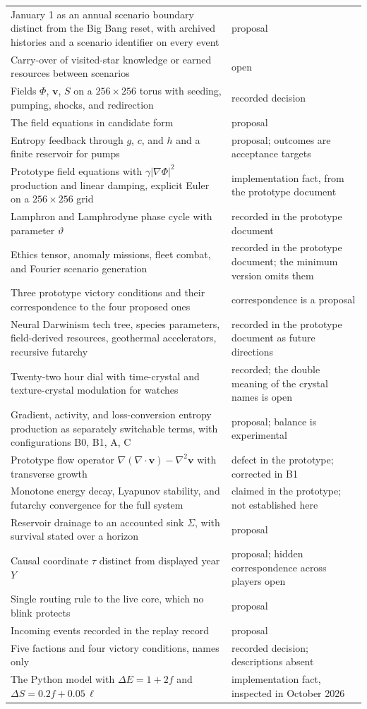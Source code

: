 \documentclass[11pt]{article}
\begin{document}
\begin{longtable}{@{}p{9.4cm}p{3.1cm}@{}}
January 1 as an annual scenario boundary distinct from the Big Bang reset, with archived histories and a scenario identifier on every event & proposal \\
Carry-over of visited-star knowledge or earned resources between scenarios & open \\
Fields $\Phi$, $\mathbf{v}$, $S$ on a $256\times256$ torus with seeding, pumping, shocks, and redirection & recorded decision \\
The field equations in candidate form & proposal \\
Entropy feedback through $g$, $c$, and $h$ and a finite reservoir for pumps & proposal; outcomes are acceptance targets \\
Prototype field equations with $\gamma|\nabla\Phi|^2$ production and linear damping, explicit Euler on a $256\times256$ grid & implementation fact, from the prototype document \\
Lamphron and Lamphrodyne phase cycle with parameter $\vartheta$ & recorded in the prototype document \\
Ethics tensor, anomaly missions, fleet combat, and Fourier scenario generation & recorded in the prototype document; the minimum version omits them \\
Three prototype victory conditions and their correspondence to the four proposed ones & correspondence is a proposal \\
Neural Darwinism tech tree, species parameters, field-derived resources, geothermal accelerators, recursive futarchy & recorded in the prototype document as future directions \\
Twenty-two hour dial with time-crystal and texture-crystal modulation for watches & recorded; the double meaning of the crystal names is open \\
Gradient, activity, and loss-conversion entropy production as separately switchable terms, with configurations B0, B1, A, C & proposal; balance is experimental \\
Prototype flow operator $\nabla(\nabla\!\cdot\mathbf{v})-\nabla^2\mathbf{v}$ with transverse growth & defect in the prototype; corrected in B1 \\
Monotone energy decay, Lyapunov stability, and futarchy convergence for the full system & claimed in the prototype; not established here \\
Reservoir drainage to an accounted sink $\Sigma$, with survival stated over a horizon & proposal \\
Causal coordinate $\tau$ distinct from displayed year $Y$ & proposal; hidden correspondence across players open \\
Single routing rule to the live core, which no blink protects & proposal \\
Incoming events recorded in the replay record & proposal \\
Five factions and four victory conditions, names only & recorded decision; descriptions absent \\
The Python model with $\Delta E = 1 + 2f$ and $\Delta S = 0.2 f + 0.05\,\ell$ & implementation fact, inspected in October 2026 \\
\bottomrule
\end{longtable}
\end{document}
